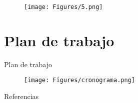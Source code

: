\documentclass[10pt]{beamer}
\begin{document}
\begin{frame}
  \begin{figure}[H] 
      \centering 
      \texttt{[image: Figures/5.png]} 
  \end{figure} 
\end{frame}











\section{Plan de trabajo}

\begin{frame}{Plan de trabajo}
  
  \begin{figure}[H] 
      \centering 
      \texttt{[image: Figures/cronograma.png]} 
  \end{figure} 
\end{frame}



\begin{frame}[allowframebreaks]{Referencias}

  
  

\end{frame}




  
\end{document}
